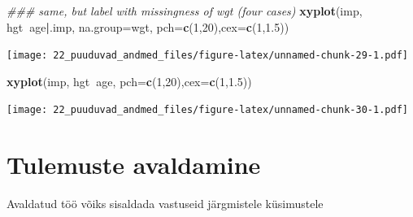 \documentclass[]{book}
\newenvironment{Shaded}{\begin{snugshade}}{\end{snugshade}}
\newcommand{\CommentTok}[1]{\textcolor[rgb]{0.56,0.35,0.01}{\textit{#1}}}
\newcommand{\DataTypeTok}[1]{\textcolor[rgb]{0.13,0.29,0.53}{#1}}
\newcommand{\DecValTok}[1]{\textcolor[rgb]{0.00,0.00,0.81}{#1}}
\newcommand{\FloatTok}[1]{\textcolor[rgb]{0.00,0.00,0.81}{#1}}
\newcommand{\KeywordTok}[1]{\textcolor[rgb]{0.13,0.29,0.53}{\textbf{#1}}}
\newcommand{\NormalTok}[1]{#1}
\newcommand{\OperatorTok}[1]{\textcolor[rgb]{0.81,0.36,0.00}{\textbf{#1}}}
\begin{document}
\begin{Shaded}
\begin{Highlighting}[]
\CommentTok{### same, but label with missingness of wgt (four cases)}
\KeywordTok{xyplot}\NormalTok{(imp, hgt}\OperatorTok{~}\NormalTok{age}\OperatorTok{|}\NormalTok{.imp, }\DataTypeTok{na.group=}\NormalTok{wgt, }\DataTypeTok{pch=}\KeywordTok{c}\NormalTok{(}\DecValTok{1}\NormalTok{,}\DecValTok{20}\NormalTok{),}\DataTypeTok{cex=}\KeywordTok{c}\NormalTok{(}\DecValTok{1}\NormalTok{,}\FloatTok{1.5}\NormalTok{))}
\end{Highlighting}
\end{Shaded}

\texttt{[image: 22\_puuduvad\_andmed\_files/figure-latex/unnamed-chunk-29-1.pdf]}

\begin{Shaded}
\begin{Highlighting}[]
\KeywordTok{xyplot}\NormalTok{(imp, hgt}\OperatorTok{~}\NormalTok{age, }\DataTypeTok{pch=}\KeywordTok{c}\NormalTok{(}\DecValTok{1}\NormalTok{,}\DecValTok{20}\NormalTok{),}\DataTypeTok{cex=}\KeywordTok{c}\NormalTok{(}\DecValTok{1}\NormalTok{,}\FloatTok{1.5}\NormalTok{))}
\end{Highlighting}
\end{Shaded}

\texttt{[image: 22\_puuduvad\_andmed\_files/figure-latex/unnamed-chunk-30-1.pdf]}

\hypertarget{tulemuste-avaldamine}{%
\section{Tulemuste avaldamine}\label{tulemuste-avaldamine}}

Avaldatud töö võiks sisaldada vastuseid järgmistele küsimustele
\end{document}
